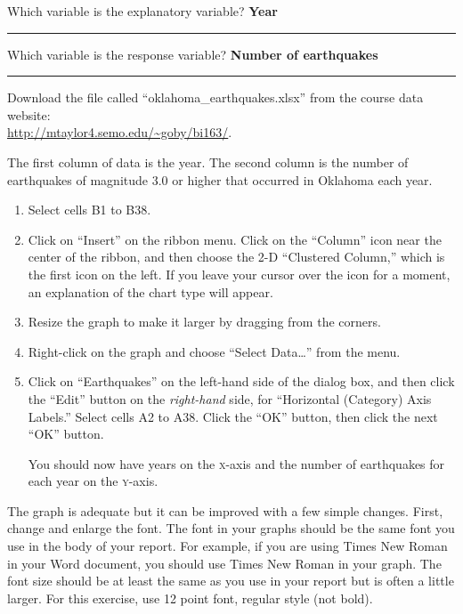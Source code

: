 \documentclass[12pt, hidelinks]{exam}
\newcommand*\AnswerBox[2]{%
	\parbox[t][#1]{0.92\textwidth}{%
		\begin{solution}#2\end{solution}
		\vskip\stretch{1}}
}
\begin{document}
\begin{questions}
	
	\question
	Which variable is the explanatory variable? \ifprintanswers \textbf{Year} \else \rule{1.5in}{0.4pt} \fi
	
	
	\medskip
	
	\question
	Which variable is the response variable? \ifprintanswers \textbf{Number of earthquakes} \else \rule{1.5in}{0.4pt} \fi
	

	\bigskip	
	
	Download the file called “oklahoma\_earthquakes.xlsx” from the course data website:\\ \url{http://mtaylor4.semo.edu/~goby/bi163/}.\bigskip
	
	The first column of data is the year. The second column is the number of earthquakes of magnitude 3.0 or higher that occurred in Oklahoma each year.

\begin{enumerate}
	\item Select cells {\liningnum B1 to B38}.
	
	\item Click on “Insert” on the ribbon menu. Click on the “Column” icon near the center of the ribbon, and then choose the 2-D “Clustered Column,” which is the first icon on the left. If you leave your cursor over the icon for a moment, an explanation of the chart type will appear.
	
	\item Resize the graph to make it larger by dragging from the corners.
	
	\item Right-click on the graph and choose “Select Data\dots” from the menu.
	
	\item Click on “Earthquakes” on the left-hand side of the dialog box, and then click the “Edit” button on the \emph{right-hand} side, for “Horizontal (Category) Axis Labels.” Select cells {\liningnum A2 to A38}. Click the “OK” button, then click the next “OK” button.
	
	You should now have years on the \textsc{x}-axis and the number of earthquakes for each year on the \textsc{y}-axis.
	
\end{enumerate}

The graph is adequate but it can be improved with a few simple changes. First, change and enlarge the font. The font in your graphs should be the same font you use in the body of your report. For example, if you are using Times New Roman in your Word document, you should use Times New Roman in your graph. The font size should be at least the same as you use in your report but is often a little larger. For this exercise, use 12 point font, regular style (not bold).


\end{questions}
\end{document}
